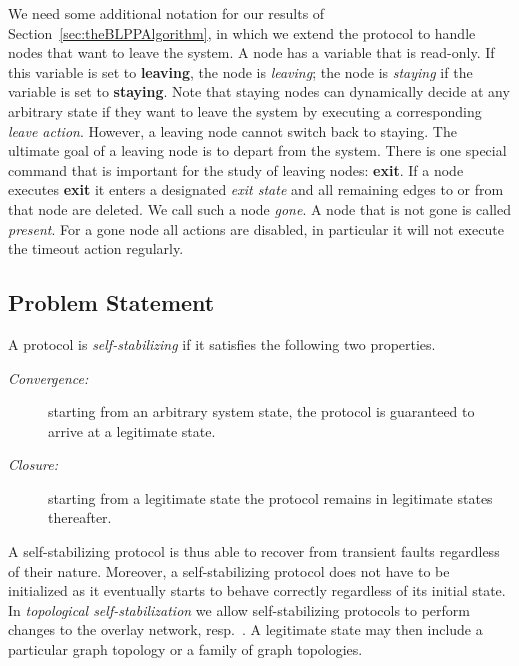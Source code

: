 \documentclass[a4paper,USenglish]{lipics}
\begin{document}
We need some additional notation for our results of Section~\ref{sec:theBLPPAlgorithm}, in which we extend the protocol to handle nodes that want to leave the system.
A node  has a variable  that is read-only. 
If this variable is set to \textbf{leaving}, the node is \emph{leaving}; the node is \emph{staying} if the variable is set to \textbf{staying}.
Note that staying nodes can dynamically decide at any arbitrary state if they want to leave the system by executing a corresponding \emph{leave action}. 
However, a leaving node cannot switch back to staying.
The ultimate goal of a leaving node is to depart from the system.
There is one special command that is important for the study of leaving nodes: \textbf{exit}. 
If a node executes \textbf{exit} it enters a designated \emph{exit state} and all remaining edges to or from that node are deleted. 
We call such a node \emph{gone}. 
A node that is not gone is called \emph{present}.
For a gone node all actions are disabled, in particular it will not execute the timeout action regularly.

\subsection{Problem Statement}

A protocol is \emph{self-stabilizing} if it satisfies the following two properties.
\begin{description}
\item[\emph{Convergence:}] starting from an arbitrary system state, the protocol is guaranteed to arrive at a legitimate state.
\item[\emph{Closure:}] starting from a legitimate state the protocol remains in legitimate states thereafter.
\end{description}
A self-stabilizing protocol is thus able to recover from transient faults regardless of their nature. 
Moreover, a self-stabilizing protocol does not have to be initialized as it eventually starts to behave correctly regardless of its initial state. 
In \emph{topological self-stabilization} we allow self-stabilizing protocols to perform changes to the overlay network, resp.~. 
A legitimate state may then include a particular graph topology or a family of graph topologies.
\end{document}
